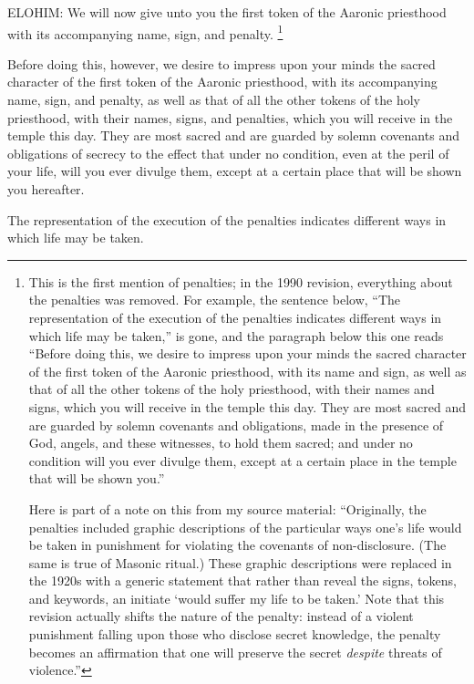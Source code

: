 				ELOHIM: We will now give unto you the first token of the Aaronic priesthood with its accompanying name, sign, and penalty.%
					\footnote{%
						\label{ENDOWMENT-penalty}%
						This is the first mention of penalties; in the 1990 revision, everything about the penalties was removed. For example, the sentence below, ``The representation of the execution of the penalties indicates different ways in which life may be taken,'' is gone, and the paragraph below this one reads ``Before doing this, we desire to impress upon your minds the sacred character of the first token of the Aaronic priesthood, with its name and sign, as well as that of all the other tokens of the holy priesthood, with their names and signs, which you will receive in the temple this day. They are most sacred and are guarded by solemn covenants and obligations, made in the presence of God, angels, and these witnesses, to hold them sacred; and under no condition will you ever divulge them, except at a certain place in the temple that will be shown you.''
						
						Here is part of a note on this from my source material: ``Originally, the penalties included graphic descriptions of the particular ways one's life would be taken in punishment for violating the covenants of non-disclosure. (The same is true of Masonic ritual.) These graphic descriptions were replaced in the 1920s with a generic statement that rather than reveal the signs, tokens, and keywords, an initiate `would suffer my life to be taken.' Note that this revision actually shifts the nature of the penalty: instead of a violent punishment falling upon those who disclose secret knowledge, the penalty becomes an affirmation that one will preserve the secret \textit{despite} threats of violence.''
						}

				Before doing this, however, we desire to impress upon your minds the sacred character of the first token of the Aaronic priesthood, with its accompanying name, sign, and penalty, as well as that of all the other tokens of the holy priesthood, with their names, signs, and penalties, which you will receive in the temple this day. They are most sacred and are guarded by solemn covenants and obligations of secrecy to the effect that under no condition, even at the peril of your life, will you ever divulge them, except at a certain place that will be shown you hereafter.

				The representation of the execution of the penalties indicates different ways in which life may be taken.

